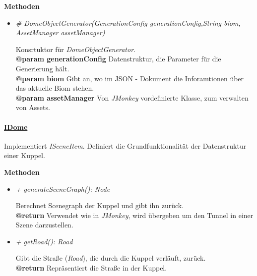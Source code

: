             \textbf{Methoden}					
            \begin{itemize}
                \item  \textit{\# DomeObjectGenerator(GenerationConfig generationConfig,String biom, AssetManager assetManager)}
                    \begin{leftbar}[0.9\linewidth]
                        Konsrtuktor für \textit{DomeObjectGenerator}.\\
                        \textbf{@param generationConfig} Datenstruktur, die Parameter für die Generierung hält.\\
                        \textbf{@param biom} Gibt an, wo im JSON - Dokument die Inforamtionen über das aktuelle Biom stehen.\\
                        \textbf{@param assetManager} Von \textit{JMonkey} vordefinierte Klasse, zum verwalten von Assets.
                    \end{leftbar}   
            \end{itemize}
            
            
            
            \paragraph{\underline{IDome}} \mbox{}\par
            Implementiert \textit{ISceneItem}. Definiert die Grundfunktionalität der Datenstruktur einer Kuppel.\par
            
            \textbf{Methoden}					
            \begin{itemize}
                \item  \textit{+ generateSceneGraph(): Node}
                    \begin{leftbar}[0.9\linewidth]
                        Berechnet Scenegraph der Kuppel und gibt ihn zurück.\\
                        \textbf{@return}  Verwendet wie in \textit{JMonkey}, wird übergeben um den Tunnel in einer Szene darzustellen.
                    \end{leftbar}

                \item  \textit{+ getRoad(): Road}
                    \begin{leftbar}[0.9\linewidth]
                        Gibt die Straße (\textit{Road}), die durch die Kuppel verläuft, zurück.\\
                        \textbf{@return} Repräsentiert die Straße in der Kuppel.
                    \end{leftbar}    
            \end{itemize}
            

